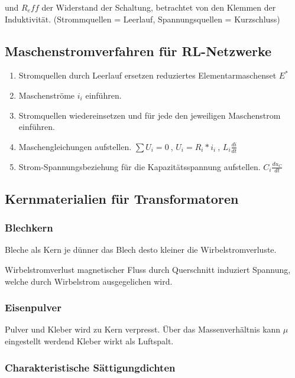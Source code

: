 \documentclass[10pt,a4paper]{scrartcl}
\begin{document}
\begin{multicols*}{3}
	und $R_eff$ der Widerstand der Schaltung, betrachtet von den Klemmen der Induktivität. (Strommquellen = Leerlauf, Spannungsquellen = Kurzschluss)
	
	 
	
	\subsection{Maschenstromverfahren für RL-Netzwerke}
	
	\begin{enumerate}
	\compaq
	\item
	Stromquellen durch Leerlauf ersetzen \dahe reduziertes Elementarmaschenset $E^*$
	\item
	Maschenströme $i_i$ einführen.
	\item
	Stromquellen wiedereinsetzen und für jede den jeweiligen Maschenstrom einführen.
	\item
	Maschengleichungen aufstellen. $\sum{U_i}=0\ $, $U_i=R_i*i_i\ $, $L_i\frac{di}{dt}$
	\item
	Strom-Spannungsbeziehung für die Kapazitätsspannung aufstellen. $C_i\frac{du_C}{dt}$
	\end{enumerate}
	
	\vfill
	\null
	\columnbreak
	
	\subsection{Kernmaterialien für Transformatoren}
	
	\subsubsection{Blechkern}
	Bleche als Kern \dahe je dünner das Blech desto kleiner die Wirbelstromverluste.
	
	Wirbelstromverlust \dahe magnetischer Fluss durch Querschnitt induziert Spannung, welche durch Wirbelstrom ausgegelichen wird.
		
	\subsubsection{Eisenpulver}
	
	Pulver und Kleber wird zu Kern verpresst. Über das Massenverhältnis kann $\mu$ eingestellt werdend \dahe Kleber wirkt als Luftspalt.
	
	 
	
	\subsubsection{Charakteristische Sättigungdichten}
	

\end{multicols*}
\end{document}
